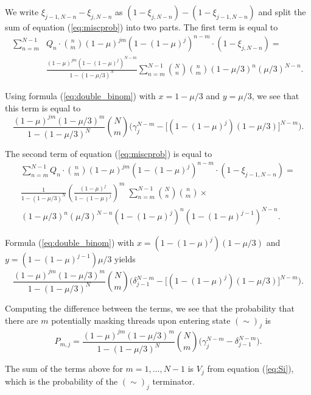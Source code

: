 \documentclass{article}
\begin{document}
We write $\xi_{j-1,N-n}-\xi_{j,N-n}$ as $(1-\xi_{j,N-n}) -
(1-\xi_{j-1,N-n})$ and split the sum of equation (\ref{eq:miscprob}) into
two parts. The first term is equal to
\begin{equation*}
\begin{split}
\sum_{n=m}^{N-1} & Q_n \cdot {n \choose m} (1-\mu)^{jm} (1-(1-\mu)^j)^{n-m}
\cdot (1 - \xi_{j,N-n}) = \\
& \frac{(1-\mu)^{jm} (1-(1-\mu)^j)^{N-m}}{1-(1-\mu/3)^N}
\sum_{n=m}^{N-1} {N \choose n} {n \choose m} (1-\mu/3)^n (\mu/3)^{N-n}.
\end{split}
\end{equation*}

Using formula (\ref{eq:double_binom}) with $x=1-\mu/3$ and $y=\mu/3$, we
see that this term is equal to
\begin{equation*}
\frac{(1-\mu)^{jm} (1-\mu/3)^m}{1-(1-\mu/3)^N} {N \choose m} 
\bigg( \gamma_j^{N-m}
-\big[ (1-(1-\mu)^j)(1-\mu/3)\big]^{N-m} \bigg).
\end{equation*}

The second term of equation (\ref{eq:miscprob}) is equal to
\begin{multline*}
\sum_{n=m}^{N-1} Q_n \cdot {n \choose m} (1-\mu)^{jm} (1-(1-\mu)^j)^{n-m}
\cdot (1 - \xi_{j-1,N-n}) = \\
\frac{1}{1-(1-\mu/3)^N}
\left(\frac{(1-\mu)^j}{1-(1-\mu)^j}\right)^m
\; \sum_{n=m}^{N-1} {N \choose n} {n \choose m} \times \\
(1-\mu/3)^n (\mu/3)^{N-n}
(1-(1-\mu)^j)^n (1-(1-\mu)^{j-1})^{N-n}.
\end{multline*}

Formula (\ref{eq:double_binom}) with $x=(1-(1-\mu)^j)(1-\mu/3)$ and
$y = (1-(1-\mu)^{j-1})\mu/3$ yields
\begin{equation*}
\frac{(1-\mu)^{jm} (1-\mu/3)^m}{1-(1-\mu/3)^N} {N \choose m}
\bigg( \delta_{j-1}^{N-m}
-\big[ (1-(1-\mu)^j)(1-\mu/3)\big]^{N-m} \bigg).
\end{equation*}

Computing the difference between the terms, we see that the probability
that there are $m$ potentially masking threads upon entering state
$(\sim)_j$ is
\begin{equation*}
P_{m,j} = \frac{(1-\mu)^{jm} (1-\mu/3)^m}{1-(1-\mu/3)^N} {N \choose m} 
\big( \gamma_j^{N-m} - \delta_{j-1}^{N-m} \big).
\end{equation*}


The sum of the terms above for $m = 1, \ldots, N-1$ is $V_j$ from equation
(\ref{eq:Si}), which is the probability of the $(\sim)_j$ terminator.
\end{document}
